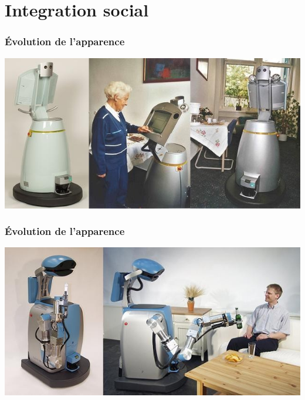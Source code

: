 \section{Integration social}

\begin{frame}
  \frametitle{\'Evolution de l'apparence}
    \includegraphics[scale = 0.36]{image/Care_O_bot_1-title.jpg}
\end{frame}

\begin{frame}
  \frametitle{\'Evolution de l'apparence}
    \includegraphics[scale = 0.36]{image/Care-O-bot_II-title.jpg}
\end{frame}

